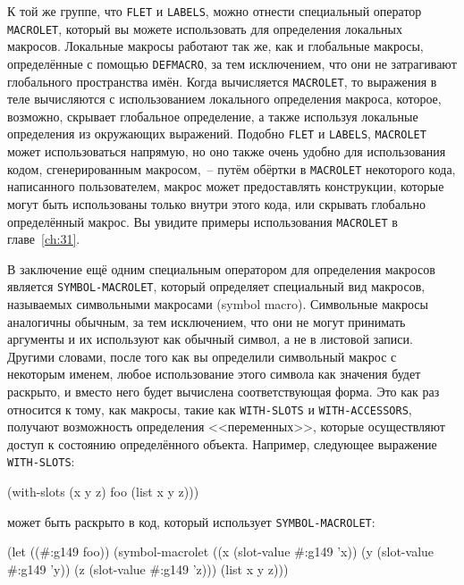 К той же группе, что \lstinline{FLET} и \lstinline{LABELS}, можно отнести специальный оператор
\lstinline{MACROLET}, который вы можете использовать для определения локальных
макросов. Локальные макросы работают так же, как и глобальные макросы, определённые с
помощью \lstinline{DEFMACRO}, за тем исключением, что они не затрагивают глобального
пространства имён.  Когда вычисляется \lstinline{MACROLET}, то выражения в теле вычисляются с
использованием локального определения макроса, которое, возможно, скрывает глобальное
определение, а также используя локальные определения из окружающих выражений.  Подобно
\lstinline{FLET} и \lstinline{LABELS}, \lstinline{MACROLET} может использоваться напрямую, но оно также
очень удобно для использования кодом, сгенерированным макросом,~-- путём обёртки в
\lstinline{MACROLET} некоторого кода, написанного пользователем, макрос может предоставлять
конструкции, которые могут быть использованы только внутри этого кода, или скрывать
глобально определённый макрос.  Вы увидите примеры использования \lstinline{MACROLET} в
главе~\ref{ch:31}.

В заключение ещё одним специальным оператором для определения макросов является
\lstinline{SYMBOL-MACROLET}, который определяет специальный вид макросов, называемых
символьными макросами (symbol macro).  Символьные макросы аналогичны обычным, за тем
исключением, что они не могут принимать аргументы и их используют как обычный символ, а
не в листовой записи.  Другими словами, после того как вы определили символьный макрос с
некоторым именем, любое использование этого символа как значения будет раскрыто, и вместо
него будет вычислена соответствующая форма.  Это как раз относится к тому, как макросы,
такие как \lstinline{WITH-SLOTS} и \lstinline{WITH-ACCESSORS}, получают возможность определения
<<переменных>>, которые осуществляют доступ к состоянию определённого объекта.  Например,
следующее выражение \lstinline{WITH-SLOTS}:

\begin{myverb}
(with-slots (x y z) foo (list x y z)))
\end{myverb}

\noindent{}может быть раскрыто в код, который использует \lstinline{SYMBOL-MACROLET}:

\begin{myverb}
(let ((#:g149 foo))
  (symbol-macrolet
      ((x (slot-value #:g149 'x))
       (y (slot-value #:g149 'y))
       (z (slot-value #:g149 'z)))
    (list x y z)))
\end{myverb}

